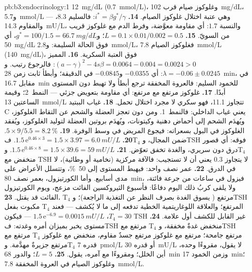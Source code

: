\begin{solution}{pb:b3:endocrinology:1}
\qty{12}{mg/dL} (\qty{0.7}{mmol/L})، وغلوكوز صيام قرب
\qty{102}{mg/dL}، و\qty{5.7}{mmol/L} --- وهي عتبة اختلال غلوكوز
الصيام.
\textbf{14.} $i^{*} = \beta g^{*}/\gamma$: فالسليم $8.3$، والمقاوم
\qty{14.3}{mU/L}، والنسبة $1.7$: أي مقاومة  معوَّضة،
وفرط  الدم مع غلوكوز قريب من السويّ.
\textbf{15.} $L = 0.1\times 0.01/0.002 = 0.5$؛ و$g^{*} = 100/1.5 =
\qty{66.7}{mg/dL}$، أي \qty{50}{mg/dL} فوق الحالة السليمة:
و\qty{2.8}{mmol/L}، فغلوكوز الصيام \qty{7.8}{mmol/L} (\qty{140}{mg/dL})،
فوق العتبة السكرية.
\textbf{16.} المميز $(a - \gamma)^{2} - 4s\beta = 0.0064 - 0.004 =
0.0024 > 0$: فالرجوع رتيب. و$\lambda = -0.06 \pm 0.0245$: أي $-0.0355$
و$-0.0845$ في الدقيقة؛ وأبطأ ثابت زمن \qty{28}{min}، في مقابل
\qty{16.7}{min} للخمود السليم: فالعروة المخفقة ترجع أبطأ ولا
تهبط دون المستوى أبدًا.
\textbf{17.} غلوكوز مرتفع مع  مرتفع: أي مقاومة بتعويض
جزئي --- النمط~2؛ وقيمة الساعتين \qty{13}{mmol/L} تتجاوز
\qty{11.1}{}، فهو سكري لا مجرد اختلال تحمل.
\textbf{18.} غياب الببتيد C يعني غياب  الداخلي:
فالنمط~1. ومن دون  تعجز العضلة والشحم عن التقاط
الغلوكوز، ويُهدَم الشحم إلى أحماض دهنية وكيتونات، ويُهدَم
بروتين العضلة لتوليد الغلوكوز، ويُفقد الغلوكوز في البول
بسعراته: فيجوع المريض في وسط الوفرة.
\textbf{19.} $5\times 9/5.5 = \qty{8.2}{\%}$.
\textbf{20.} $1.5\,\mathrm{e}^{0.46\times 3} = 1.5\times 3.97 =
\qty{6.0}{mU/L}$. فT$_{4}$ ضمن المجال، وTSH فوقه: أي قصور درق
دون سريري، والغدة تخفق  تعوّض.
\textbf{21.} $1.5\,\mathrm{e}^{0.46\times 8} = 1.5\times 39.6 =
\qty{59}{mU/L}$. وT$_{4}$ منخفض مع TSH لا يتجاوز $0.3$ يعني أن
 لا تستجيب: فالآفة مركزية (نخامية أو وطائية)، لا في
الدرق.
\textbf{22.} عمر نصف واحد: فيهبط المستوى إلى \qty{50}{\%}، وتتسلل
الأعراض على مدى أسابيع. وأما الكورتيزول، بعمر نصف
\qty{80}{min}، فيزول في ساعات من جرعة فائتة، ولا يلقى كربُ
ذلك اليوم دفاعًا: فأسبوع الثيروكسين الفائت مزعج، ويوم
الكورتيزول الفائت قد يقتل.
\textbf{23.} T$_{4}$ مرتفع ( يسوق الغدة بصرف النظر عن
التغذية الراجعة)؛ وTSH مكبوت بفعل T$_{4}$ المرتفع؛ والعلاقة
اللوغاريتمية الخطية تدفعه إلى ما لا يُكشف --- فعند
$T_{4} = 30$، $1.5\,\mathrm{e}^{-6.9}
= \qty{0.0015}{mU/L}$ --- فيكون TSH غير القابل للكشف أول علامة.
\textbf{24.} مستوى  يخبر بميزان أمره وغدته: فTSH مرتفع
مع T$_{4}$ منخفض غدةٌ مخفقة، وTSH مرتفع مع T$_{4}$ مرتفع
 جامحة؛  مرتفع مع غلوكوز مرتفع جسدٌ مقاوم،
 منخفض مع غلوكوز مرتفع جزيرةٌ مهدَّمة. وT$_{4}$ قدره
\qty{7}{pmol/L} أو  قدره \qty{30}{mU/L} لا يقول، مقروءًا
وحده، أين الخلل؛ ومقروءًا مع آمره، يقول.
\textbf{25.}  $L = 5$؛ والدور \qty{68}{min} وزمن الخمود
\qty{17}{min}؛ وغلوكوز الصيام في العروة المخفقة \qty{7.8}{mmol/L}.
\end{solution}
